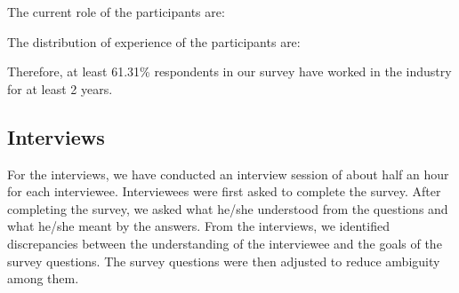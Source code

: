 The current role of the participants are: 


The distribution of experience of the participants are:


Therefore, at least 61.31\% respondents in our survey have worked in the industry for at least 2 years.

\subsection{Interviews}
\label{interviews}
For the interviews, we have conducted an interview session of about half an hour for each interviewee. Interviewees were first asked to complete the survey. After completing the survey, we asked what he/she understood from the questions and what he/she meant by the answers. From the interviews, we identified discrepancies between the understanding of the interviewee and the goals of the survey questions. The survey questions were then adjusted to reduce ambiguity among them.

